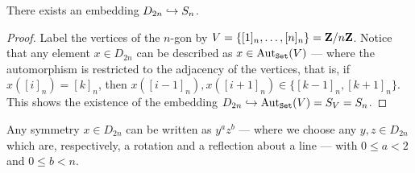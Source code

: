 \begin{proposition}\label{prop: dihetral-to-sym}
There exists an embedding \(D_{2n} \hookrightarrow S_n\).
\end{proposition}

\begin{proof}
Label the vertices of the \(n\)-gon by \(V = \{[1]_n, \dots, [n]_n\} =
\mathbf{Z}/n\mathbf{Z}\). Notice that any element \(x \in D_{2n}\) can be described as \(x \in
\operatorname{Aut}_{\texttt{Set}}(V)\) --- where the automorphism is restricted to the adjacency of
the vertices, that is, if \(x([i]_n) = [k]_n\), then \(x([i - 1]_n), x([i +
1]_n) \in \{[k - 1]_n, [k + 1]_n\}\). This shows the existence of the
embedding \(D_{2n} \hookrightarrow \operatorname{Aut}_{\texttt{Set}}(V) = S_V = S_n\).
\end{proof}

\begin{proposition}
Any symmetry \(x \in D_{2n}\) can be written as \(y^a z^b\) --- where we
choose any \(y, z \in D_{2n}\) which are, respectively, a rotation and a
reflection about a line --- with \(0 \leq a < 2\) and \(0 \leq b < n\).
\end{proposition}

